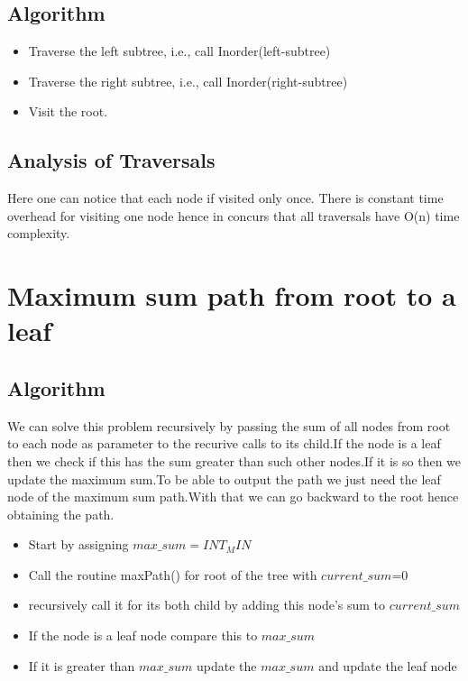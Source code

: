 \documentclass[12pt]{article}
\begin{document}
\subsection*{Algorithm}
\begin{itemize}

   \item Traverse the left subtree, i.e., call Inorder(left-subtree)
  \item  Traverse the right subtree, i.e., call Inorder(right-subtree)
  \item Visit the root.

\end{itemize}

\subsection*{ Analysis of Traversals}

Here one can notice that each node if visited only once. There is constant time overhead for visiting one node hence in concurs that all traversals have O(n) time complexity.

\section*{Maximum sum path from root to a leaf}

\subsection*{Algorithm}
We can solve this problem recursively by passing the sum of all nodes from root to each node as parameter to the recurive calls to its child.If the node is a leaf then we check if this has the sum greater than such other nodes.If it is so then we update the maximum sum.To be able to output the path we just need the leaf node of the maximum sum path.With that we can go backward to the root hence obtaining the path.
\begin{itemize}

\item  Start by assigning $max\_sum =INT_MIN $
\item Call the routine maxPath() for root of the tree with $current\_sum$=$0$
\item recursively call it for its both child by adding this node's sum to $current\_sum$
\item If the node is a leaf node compare this to $max\_sum$
\item If it is greater than $max\_sum$ update the $max\_sum$ and update the leaf node

\end{itemize}
\end{document}
